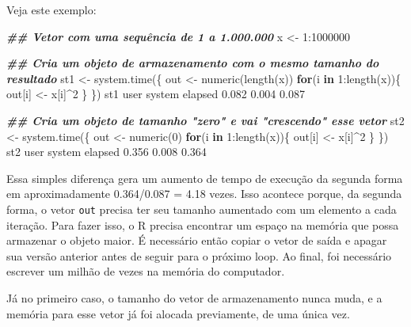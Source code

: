 \documentclass[
  10pt,
  a4paper]{book}
\newenvironment{Shaded}{\begin{snugshade}}{\end{snugshade}}
\newcommand{\ControlFlowTok}[1]{\textcolor[rgb]{0.13,0.29,0.53}{\textbf{#1}}}
\newcommand{\DecValTok}[1]{\textcolor[rgb]{0.00,0.00,0.81}{#1}}
\newcommand{\DocumentationTok}[1]{\textcolor[rgb]{0.56,0.35,0.01}{\textbf{\textit{#1}}}}
\newcommand{\FloatTok}[1]{\textcolor[rgb]{0.00,0.00,0.81}{#1}}
\newcommand{\FunctionTok}[1]{\textcolor[rgb]{0.00,0.00,0.00}{#1}}
\newcommand{\NormalTok}[1]{#1}
\newcommand{\OtherTok}[1]{\textcolor[rgb]{0.56,0.35,0.01}{#1}}
\newcommand{\SpecialCharTok}[1]{\textcolor[rgb]{0.00,0.00,0.00}{#1}}
\begin{document}
Veja este exemplo:

\begin{Shaded}
\begin{Highlighting}[]
\DocumentationTok{\#\# Vetor com uma sequência de 1 a 1.000.000}
\NormalTok{x }\OtherTok{\textless{}{-}} \DecValTok{1}\SpecialCharTok{:}\DecValTok{1000000}

\DocumentationTok{\#\# Cria um objeto de armazenamento com o mesmo tamanho do resultado}
\NormalTok{st1 }\OtherTok{\textless{}{-}} \FunctionTok{system.time}\NormalTok{(\{}
\NormalTok{    out }\OtherTok{\textless{}{-}} \FunctionTok{numeric}\NormalTok{(}\FunctionTok{length}\NormalTok{(x))}
    \ControlFlowTok{for}\NormalTok{(i }\ControlFlowTok{in} \DecValTok{1}\SpecialCharTok{:}\FunctionTok{length}\NormalTok{(x))\{}
\NormalTok{        out[i] }\OtherTok{\textless{}{-}}\NormalTok{ x[i]}\SpecialCharTok{\^{}}\DecValTok{2}
\NormalTok{    \}}
\NormalTok{\})}
\NormalTok{st1}
\NormalTok{   user  system elapsed }
  \FloatTok{0.082}   \FloatTok{0.004}   \FloatTok{0.087} 

\DocumentationTok{\#\# Cria um objeto de tamanho "zero" e vai "crescendo" esse vetor}
\NormalTok{st2 }\OtherTok{\textless{}{-}} \FunctionTok{system.time}\NormalTok{(\{}
\NormalTok{    out }\OtherTok{\textless{}{-}} \FunctionTok{numeric}\NormalTok{(}\DecValTok{0}\NormalTok{)}
    \ControlFlowTok{for}\NormalTok{(i }\ControlFlowTok{in} \DecValTok{1}\SpecialCharTok{:}\FunctionTok{length}\NormalTok{(x))\{}
\NormalTok{        out[i] }\OtherTok{\textless{}{-}}\NormalTok{ x[i]}\SpecialCharTok{\^{}}\DecValTok{2}
\NormalTok{    \}}
\NormalTok{\})}
\NormalTok{st2}
\NormalTok{   user  system elapsed }
  \FloatTok{0.356}   \FloatTok{0.008}   \FloatTok{0.364} 
\end{Highlighting}
\end{Shaded}

Essa simples diferença gera um aumento de tempo de execução da segunda
forma em aproximadamente
0.364/0.087 = 4.18 vezes. Isso acontece
porque, da segunda forma, o vetor \texttt{out} precisa ter seu tamanho
aumentado com um elemento a cada iteração. Para fazer isso, o R precisa
encontrar um espaço na memória que possa armazenar o objeto maior. É
necessário então copiar o vetor de saída e apagar sua versão anterior
antes de seguir para o próximo loop. Ao final, foi necessário escrever
um milhão de vezes na memória do computador.

Já no primeiro caso, o tamanho do vetor de armazenamento nunca muda, e a
memória para esse vetor já foi alocada previamente, de uma única vez.
\end{document}
